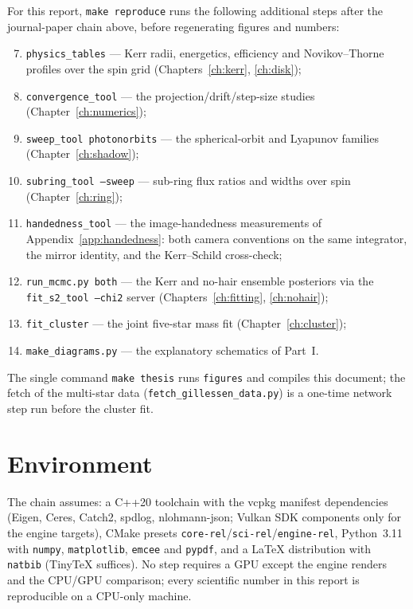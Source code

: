 For this report, \texttt{make reproduce} runs the following additional
steps after the journal-paper chain above, before regenerating figures
and numbers:
\begin{enumerate}
\setcounter{enumi}{6}
\item \texttt{physics\_tables} — Kerr radii, energetics, efficiency and
Novikov--Thorne profiles over the spin grid (Chapters~\ref{ch:kerr},
\ref{ch:disk});
\item \texttt{convergence\_tool} — the projection/drift/step-size
studies (Chapter~\ref{ch:numerics});
\item \texttt{sweep\_tool photonorbits} — the spherical-orbit and
Lyapunov families (Chapter~\ref{ch:shadow});
\item \texttt{subring\_tool --sweep} — sub-ring flux ratios and widths
over spin (Chapter~\ref{ch:ring});
\item \texttt{handedness\_tool} — the image-handedness measurements of
Appendix~\ref{app:handedness}: both camera conventions on the same
integrator, the mirror identity, and the Kerr--Schild cross-check;
\item \texttt{run\_mcmc.py both} — the Kerr and no-hair ensemble
posteriors via the \texttt{fit\_s2\_tool --chi2} server
(Chapters~\ref{ch:fitting}, \ref{ch:nohair});
\item \texttt{fit\_cluster} — the joint five-star mass fit
(Chapter~\ref{ch:cluster});
\item \texttt{make\_diagrams.py} — the explanatory schematics of
Part~I.
\end{enumerate}
The single command \texttt{make thesis} runs \texttt{figures} and
compiles this document; the fetch of the multi-star data
(\texttt{fetch\_gillessen\_data.py}) is a one-time network step run
before the cluster fit.

\section*{Environment}

The chain assumes: a C++20 toolchain with the vcpkg manifest
dependencies (Eigen, Ceres, Catch2, spdlog, nlohmann-json; Vulkan SDK
components only for the engine targets), CMake presets
\texttt{core-rel}/\texttt{sci-rel}/\texttt{engine-rel}, Python~3.11
with \texttt{numpy}, \texttt{matplotlib}, \texttt{emcee} and
\texttt{pypdf}, and a \LaTeX{} distribution with \texttt{natbib}
(TinyTeX suffices). No step requires a GPU except the engine renders
and the CPU/GPU comparison; every scientific number in this report is
reproducible on a CPU-only machine.

